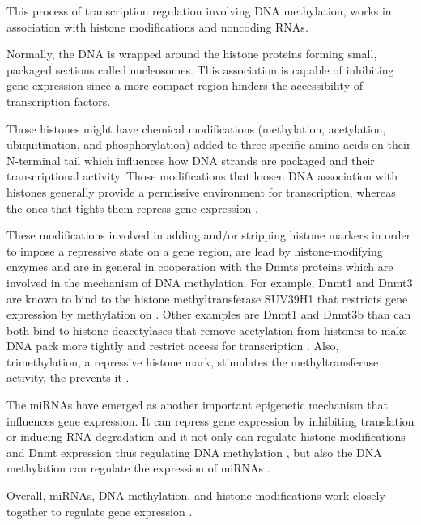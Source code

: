 This process of transcription regulation involving DNA methylation,
works in association with histone modifications and noncoding RNAs.

Normally, the DNA is wrapped around the histone proteins forming small, packaged sections called nucleosomes.
This association is capable of inhibiting gene expression since a more compact region
hinders the accessibility of transcription factors.

Those histones might have chemical modifications (methylation, acetylation, ubiquitination, and phosphorylation) added to three specific amino acids on their N-terminal tail which influences how DNA strands are packaged and their transcriptional activity.
Those modifications that loosen DNA association with histones generally provide a permissive environment for transcription, whereas the ones that tights them repress gene expression \cite{moore2013dna}.

These modifications involved in adding and/or stripping histone markers in order to impose a repressive state on a gene region, are lead by histone-modifying enzymes and are in general in cooperation with the Dnmts proteins
which are involved in the mechanism of DNA methylation.
For example, Dnmt1 and Dnmt3 are known to bind to the histone methyltransferase SUV39H1 that
restricts gene expression by methylation on  \cite{fuks2003dna}.
Other examples are Dnmt1 and Dnmt3b than can both bind to histone deacetylases that remove
acetylation from histones to make DNA pack more tightly and restrict access for transcription \cite{fuks2000dna,geiman2004dnmt3b}.
Also,  trimethylation, a repressive histone mark, stimulates the methyltransferase activity, the  prevents it \cite{ooi2007dnmt3l,zhang2010chromatin}.

The miRNAs have emerged as another important epigenetic mechanism that influences gene expression.
It can repress gene expression by inhibiting translation or inducing RNA degradation \cite{berezikov2011evolution} and
 it not only can regulate histone modifications and Dnmt expression thus regulating DNA methylation \cite{benetti2008mammalian,sinkkonen2008micrornas}, but also the DNA methylation can regulate the expression of miRNAs \cite{han2007dna,lujambio2008microrna}.

Overall, miRNAs, DNA methylation, and histone modifications work closely
together to regulate gene expression \cite{moore2013dna}.

